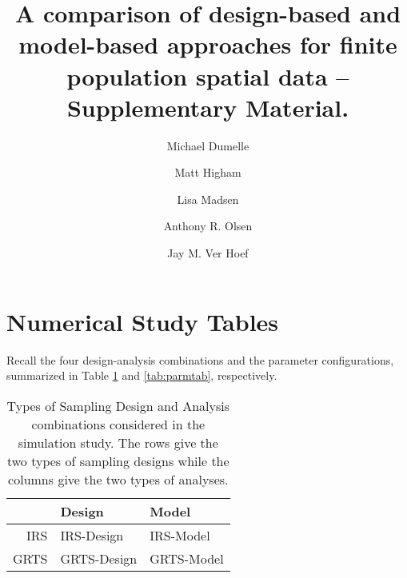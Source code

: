 \documentclass[]{elsarticle} %
\begin{document}
\begin{frontmatter}

  \title{A comparison of design-based and model-based approaches for finite
population spatial data -- Supplementary Material.}
    \author[USEPA]{Michael Dumelle}
    \author[STLAW]{Matt Higham}
  
    \author[OSU]{Lisa Madsen}
  
    \author[USEPA]{Anthony R. Olsen}
  
    \author[NOAA]{Jay M. Ver Hoef}
  
      \address[USEPA]{United States Environmental Protection Agency, 200 SW 35th St,
Corvallis, Oregon, 97333}
    \address[STLAW]{Saint Lawrence University Department of Mathematics, Computer Science,
and Statistics, 23 Romoda Drive, Canton, New York, 13617}
    \address[OSU]{Oregon State University Department of Statistics, 239 Weniger Hall,
Corvallis, Oregon, 97331}
    \address[NOAA]{Marine Mammal Laboratory, Alaska Fisheries Science Center, National
Oceanic and Atmospheric Administration, Seattle, Washington, 98115}
  
  \begin{abstract}
  
  \end{abstract}
  
 \end{frontmatter}

\hypertarget{sec:numstudy}{%
\section{Numerical Study Tables}\label{sec:numstudy}}

Recall the four design-analysis combinations and the parameter
configurations, summarized in Table \ref{tab:designanalysis} and
\ref{tab:parmtab}, respectively.

\begin{table}[ht]
\centering
\begin{tabular}{r|ll}
  \hline
 & Design & Model \\ 
  \hline
IRS & IRS-Design & IRS-Model \\ 
  GRTS & GRTS-Design & GRTS-Model \\ 
   \hline
\end{tabular}
\caption{\label{tab:designanalysis} Types of Sampling Design and Analysis combinations considered in the simulation study. The rows give the two types of sampling designs while the columns give the two types of analyses.} 
\end{table}
\end{document}
